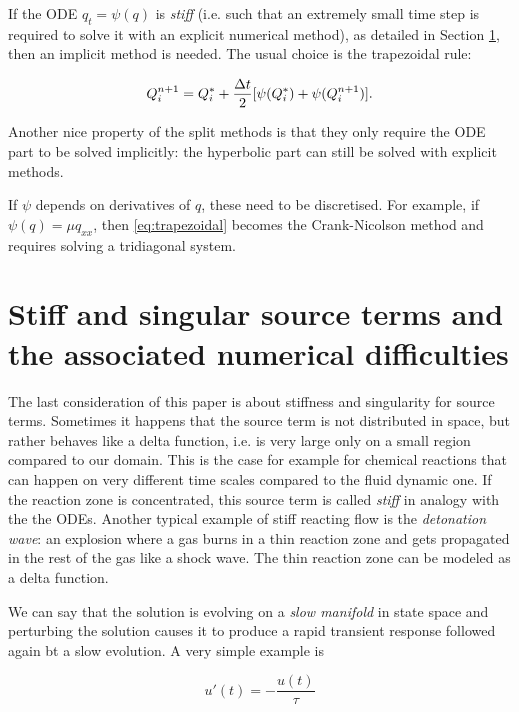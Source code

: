 \documentclass[journal,onecolumn]{IEEEtran}
\begin{document}
If the ODE $q_t=\psi(q)$ is \textit{stiff} (i.e. such that an extremely small time step is required to solve it with an explicit numerical method), as detailed in Section \ref{sec:stiff}, then an implicit method is needed. The usual choice is the trapezoidal rule:

\begin{equation}\label{eq:trapezoidal}
	Q_i^{n+1} = Q_i^*+\frac{\Delta t}{2}[\psi(Q_i^*)+\psi(Q_i^{n+1})].
\end{equation}

Another nice property of the split methods is that they only require the ODE part to be solved implicitly: the hyperbolic part can still be solved with explicit methods.

If $\psi$ depends on derivatives of $q$, these need to be discretised. For example, if $\psi(q)=\mu q_{xx}$, then \eqref{eq:trapezoidal} becomes the Crank-Nicolson method and requires solving a tridiagonal system.

\section{Stiff and singular source terms and the associated numerical difficulties} \label{sec:stiff}

The last consideration of this paper is about stiffness and singularity for source terms. Sometimes it happens that the source term is not distributed in space, but rather behaves like a delta function, i.e. is very large only on a small region compared to our domain. This is the case for example for chemical reactions that can happen on very different time scales compared to the fluid dynamic one. If the reaction zone is concentrated, this source term is called \textit{stiff} in analogy with the the ODEs. Another typical example of stiff reacting flow is the \textit{detonation wave}: an explosion where a gas burns in a thin reaction zone and gets propagated in the rest of the gas like a shock wave. The thin reaction zone can be modeled as a delta function.

We can say that the solution is evolving on a \textit{slow manifold} in state space and perturbing the solution causes it to produce a rapid transient response followed again bt a slow evolution. A very simple example is

\begin{equation}\label{eq:stiff}
	u'(t)=-\frac{u(t)}{\tau}
\end{equation}
\end{document}
